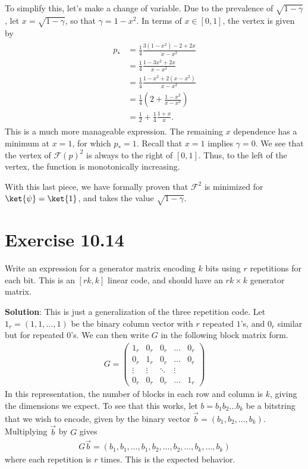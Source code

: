 \documentclass{book}
\begin{document}
    To simplify this, let's make a change of variable. Due to the prevalence of $\sqrt{1-\gamma}$, let $x = \sqrt{1-\gamma}$, so that $\gamma = 1- x^2$. In terms of $x\in [0,1]$, the vertex is given by
    \begin{align}
    \begin{aligned}
        p_* &= \frac{1}{4} \frac{3(1-x^2) - 2 + 2x}{x - x^2} \\
        &= \frac{1}{4} \frac{1 - 3 x^2 + 2x}{x - x^2} \\
        &= \frac{1}{4} \frac{1 - x^2 + 2(x - x^2)}{x - x^2} \\
        &= \frac{1}{4}\left(2 + \frac{1-x^2}{x - x^2}\right) \\
        &= \frac{1}{2} + \frac{1}{4} \frac{1 + x}{x}.
    \end{aligned}
    \end{align}
    This is a much more manageable expression. The remaining $x$ dependence has a minimum at $x = 1$, for which $p _* = 1$. Recall that $x = 1$ implies $\gamma = 0$. We see that the vertex of $\mathcal{F}(p)^2$ is always to the right of $[0,1]$. Thus, to the left of the vertex, the function is monotonically increasing. 
    
    With this last piece, we have formally proven that $\mathcal{F}^2$ is minimized for $\ket{\psi} = \ket{1}$, and takes the value $\sqrt{1-\gamma}$.

\section*{Exercise 10.14}
    Write an expression for a generator matrix encoding $k$ bits using $r$ repetitions for each bit. This is an $[rk, k]$ linear code, and should have an $rk\times k$ generator matrix.
    
    \textbf{Solution}: This is just a generalization of the three repetition code. Let $1_r = (1,1,\dots,1)$ be the binary column vector with $r$ repeated $1$'s, and $0_r$ similar but for repeated $0$'s. We can then write $G$ in the following block matrix form.
    \begin{align}
        G = \begin{pmatrix}
            1_r & 0_r & 0_r & \dots & 0_r \\
            0_r & 1_r & 0_r & \dots & 0_r \\
            \vdots & \vdots & \ddots & \vdots \\
            0_r & 0_r & 0_r & \dots & 1_r
        \end{pmatrix}
    \end{align}
    In this representation, the number of blocks in each row and column is $k$, giving the dimensions we expect. To see that this works, let $b = b_1 b_2 \dots b_k$ be a bitstring that we wish to encode, given by the binary vector $\vec{b} = (b_1, b_2, \dots, b_k)$. Multiplying $\vec{b}$ by $G$ gives
    \begin{align}
        G \vec{b} = (b_1, b_1, \dots, b_1, b_2, \dots, b_2, \dots, b_k, \dots, b_k)
    \end{align}
    where each repetition is $r$ times. This is the expected behavior.
\end{document}
